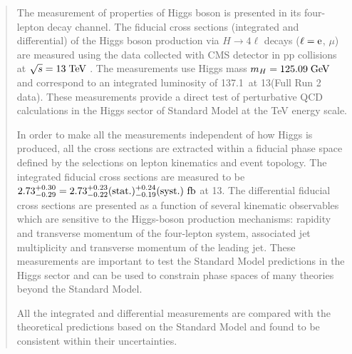 \begin{abstract}
\addchaptertocentry{\abstractname} %
	The measurement of properties of Higgs boson is presented in its four-lepton decay channel. The fiducial cross sections (integrated and differential) of the Higgs boson production  via $ H \to 4\ell$ decays ($\ell = \Pe$, $\mu$) are measured using the data collected with CMS detector in pp collisions at $\sqrt{s} = 13\TeV$ . The measurements use Higgs mass $m_H = 125.09\GeV$ and correspond to an integrated luminosity of 137.1~\ifb at 13\TeV (Full Run 2 data). 
	These measurements provide a direct test of perturbative QCD  calculations in the Higgs sector of Standard Model at the TeV energy scale. 
\par 
	In order to make all the measurements independent of how Higgs is produced, all the cross sections are extracted within a fiducial phase space defined by the selections on lepton kinematics and event topology. The integrated fiducial cross sections are measured to be $2.73^{+0.30}_{-0.29}=2.73^{+0.23}_{-0.22}({\rm stat.})^{+0.24}_{-0.19}({\rm syst.})~{\rm fb}$ at 13\TeV.
The differential fiducial cross sections are presented as a function of several kinematic observables which are sensitive to the Higgs-boson 
production mechanisms: rapidity and transverse momentum of the four-lepton system, associated jet multiplicity and transverse momentum of the leading jet.
These measurements are important to test the Standard Model predictions in the Higgs sector and can be used to constrain phase spaces of many theories beyond the Standard Model.
\par
	All the integrated and differential measurements are compared with the theoretical predictions based on the Standard Model and found to be consistent within their uncertainties.   %
\end{abstract}
